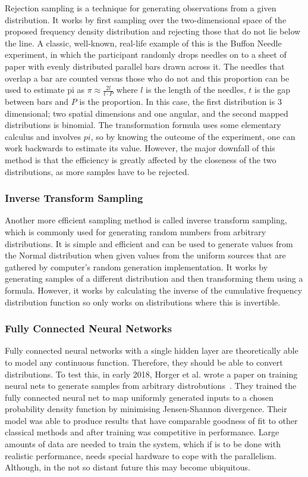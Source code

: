 \documentclass[ %
                    author={Samuel Russell},
                supervisor={Prof. Bogdan Warinschi},
                    degree={MEng},
                     title={Innocuous Ciphertexts},
                  subtitle={The DE-CENSOR Scheme},
                      type={research},
                      year={2018} ]{dissertation}
\begin{document}
Rejection sampling is a technique for generating observations from a given distribution.
It works by first sampling over the two-dimensional space of the proposed frequency density distribution and rejecting those that do not lie below the line.
A classic, well-known, real-life example of this is the Buffon Needle experiment, in which the participant randomly drops needles on to a sheet of paper with evenly distributed parallel bars drawn across it.
The needles that overlap a bar are counted versus those who do not and this proportion can be used to estimate pi as $\pi \approx \frac{2l}{t \cdot P}$ where $l$ is the length of the needles, $t$ is the gap between bars and $P$ is the proportion.
In this case, the first distribution is 3 dimensional; two spatial dimensions and one angular, and the second mapped distributions is binomial.
The transformation formula uses some elementary calculus and involves $pi$, so by knowing the outcome of the experiment, one can work backwards to estimate its value.
However, the major downfall of this method is that the efficiency is greatly affected by the closeness of the two distributions, as more samples have to be rejected.

\subsubsection{Inverse Transform Sampling}

Another more efficient sampling method is called inverse transform sampling, which is commonly used for generating random numbers from arbitrary distributions.
It is simple and efficient and can be used to generate values from the Normal distribution when given values from the uniform sources that are gathered by computer's random generation implementation.
It works by generating samples of a different distribution and then transforming them using a formula.
However, it works by calculating the inverse of the cumulative frequency distribution function so only works on distributions where this is invertible.

\subsubsection{Fully Connected Neural Networks}

Fully connected neural networks with a single hidden layer are theoretically able to model any continuous function.
Therefore, they should be able to convert distributions.
To test this, in early 2018, Horger et al. wrote a paper on training neural nets to generate samples from arbitrary distrobutions~\cite{deepl}.
They trained the fully connected neural net to map uniformly generated inputs to a chosen probability density function by minimising Jensen-Shannon divergence.
Their model was able to produce results that have comparable goodness of fit to other classical methods and after training was competitive in performance.
Large amounts of data are needed to train the system, which if is to be done with realistic performance, needs special hardware to cope with the parallelism. Although, in the not so distant future this may become ubiquitous.
\end{document}
